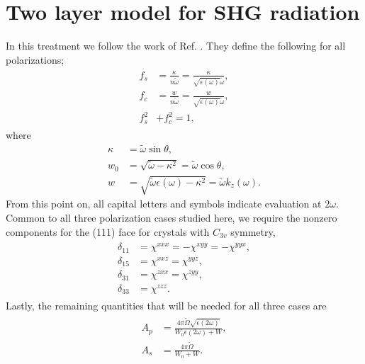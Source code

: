 \documentclass[10pt]{article}
\begin{document}
\section{Two layer model for SHG radiation}

In this treatment we follow the work of Ref. \cite{sipePRB87}. They define the
following for all polarizations;
\begin{align}\label{fcfs} %
\begin{split}
f_{s} &= \frac{\kappa}{n\tilde{\omega}}
       = \frac{\kappa}{\sqrt{\epsilon(\omega)}\tilde{\omega}},\\
f_{c} &= \frac{w}{n\tilde{\omega}}
       = \frac{w}{\sqrt{\epsilon(\omega)}\tilde{\omega}},\\
f^{2}_{s} &+ f^{2}_{c} = 1,
\end{split}
\end{align}
where 
\begin{align}
\kappa &= \tilde{\omega}\sin\theta,\nonumber\\
w_{0}  &= \sqrt{\tilde{\omega} - \kappa^{2}}
        = \tilde{\omega}\cos\theta,\label{wzero}\\ %
w      &= \sqrt{\tilde{\omega}\epsilon(\omega) - \kappa^{2}}
        = \tilde{\omega}k_{z}(\omega).\label{w} %
\end{align}
From this point on, all capital letters and symbols indicate evaluation at
$2\omega$. Common to all three polarization cases studied here, we require the
nonzero components for the (111) face for crystals with $C_{3v}$ symmetry,
\begin{align}\label{deltas} %
\begin{split}
\delta_{11} &= \chi^{xxx} = -\chi^{xyy} = -\chi^{yyx},\\
\delta_{15} &= \chi^{xxz} =  \chi^{yyz},\\
\delta_{31} &= \chi^{zxx} =  \chi^{zyy},\\
\delta_{33} &= \chi^{zzz}.
\end{split}
\end{align}
Lastly, the remaining quantities that will be needed for all three cases are
\begin{align}\label{apas} %
\begin{split}
A_{p} &= \frac{4\pi\tilde{\Omega}\sqrt{\epsilon(2\omega)}}
              {W_{0}\epsilon(2\omega) + W},\\
A_{s} &= \frac{4\pi\tilde{\Omega}}{W_{0} + W}.
\end{split}
\end{align}
\end{document}
